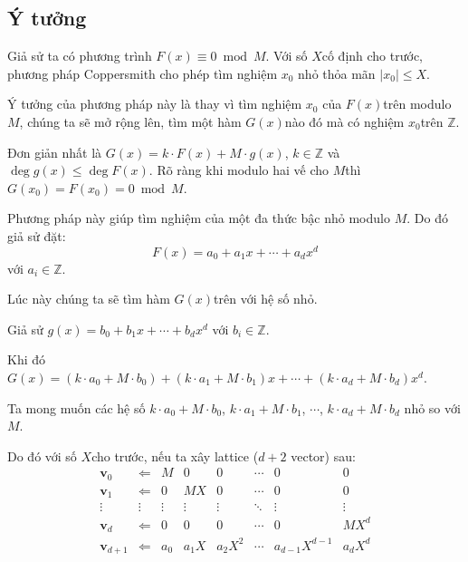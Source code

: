 \subsection*{Ý tưởng}

Giả sử ta có phương trình $F(x) \equiv 0 \bmod M$​. Với số $X$​ cố định cho trước, phương pháp Coppersmith cho phép tìm nghiệm $x_0$ nhỏ thỏa mãn $\lvert x_0 \rvert \leqslant X$​.

Ý tưởng của phương pháp này là thay vì tìm nghiệm $x_0$ của $F(x)$​ trên modulo $M$​, chúng ta sẽ mở rộng lên, tìm một hàm $G(x)$​ nào đó mà có nghiệm $x_0$​ trên $\mathbb{Z}$​.

Đơn giản nhất là $G(x) = k \cdot F(x) + M \cdot g(x)$​, $k \in \mathbb{Z}$ và $\deg g(x) \leqslant \deg F(x)$. Rõ ràng khi modulo hai vế cho $M$​ thì $G(x_0) = F(x_0) = 0 \bmod M$.

Phương pháp này giúp tìm nghiệm của một đa thức bậc nhỏ modulo $M$​. Do đó giả sử đặt:
\begin{equation*}
    F(x) = a_0 + a_1 x + \cdots + a_d x^d
\end{equation*}​
với $a_i \in \mathbb{Z}$.

Lúc này chúng ta sẽ tìm hàm $G(x)$​ trên với hệ số nhỏ.

Giả sử $g(x) = b_0 + b_1 x + \cdots + b_d x^d$ với $b_i \in \mathbb{Z}$.

Khi đó $G(x) = (k \cdot a_0 + M \cdot b_0) + (k \cdot a_1 + M \cdot b_1) x + \cdots + (k \cdot a_d + M \cdot b_d) x^d$. 

Ta mong muốn các hệ số $k \cdot a_0 + M \cdot b_0$​, $k \cdot a_1 + M \cdot b_1$​, $\cdots$​, $k \cdot a_d + M \cdot b_d$ nhỏ so với $M$​.

Do đó với số $X$​ cho trước, nếu ta xây lattice ($d+2$ vector) sau:
\begin{equation*}
    \begin{array}{cccccccc}
        \bm{v}_0 & \Leftarrow & M & 0 & 0 & \cdots & 0 & 0 \\
        \bm{v}_1 & \Leftarrow & 0 & MX & 0 & \cdots & 0 & 0 \\
        \vdots & \vdots & \vdots & \vdots & \vdots & \ddots & \vdots & \vdots \\
        \bm{v}_d & \Leftarrow & 0 & 0 & 0 & \cdots & 0 & MX^d \\
        \bm{v}_{d+1} & \Leftarrow & a_0 & a_1 X & a_2 X^2 & \cdots & a_{d-1} X^{d-1} & a_d X^d
    \end{array}
\end{equation*}

